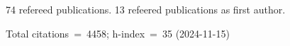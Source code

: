 74 refereed publications. 13 refeered publications as first author.

Total citations~=~4458; h-index~=~35 (2024-11-15)